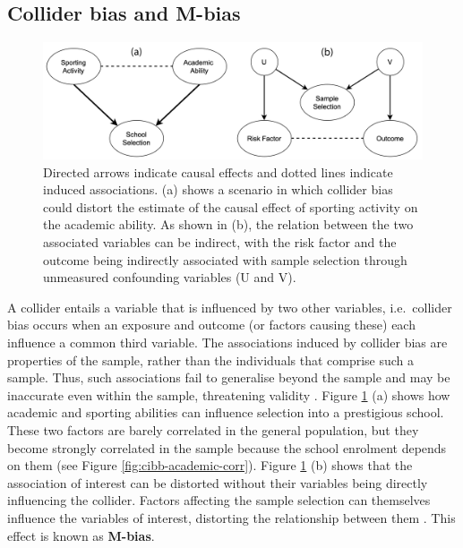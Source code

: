 \documentclass[
]{book}
\begin{document}
\hypertarget{collider-bias-and-m-bias}{%
\subsection{Collider bias and M-bias}\label{collider-bias-and-m-bias}}

\begin{figure}

{\centering \includegraphics[width=0.9\linewidth]{Figures/collider_and_m_bias} 

}

\caption{Directed arrows indicate causal effects and dotted lines indicate induced associations. (a) shows a scenario in which collider bias could distort the estimate of the causal effect of sporting activity on the academic ability. As shown in (b), the relation between the two associated variables can be indirect, with the risk factor and the outcome being indirectly associated with sample selection through unmeasured confounding variables (U and V).}\label{fig:cibb-collider}
\end{figure}

A collider entails a variable that is influenced by two other variables, i.e.~collider bias occurs when an exposure and outcome (or factors causing these) each influence a common third variable. The associations induced by collider bias are properties of the sample, rather than the individuals that comprise such a sample. Thus, such associations fail to generalise beyond the sample and may be inaccurate even within the sample, threatening validity \citep{garcia2021need}. Figure \ref{fig:cibb-collider} (a) shows how academic and sporting abilities can influence selection into a prestigious school. These two factors are barely correlated in the general population, but they become strongly correlated in the sample because the school enrolment depends on them (see Figure \ref{fig:cibb-academic-corr}). Figure \ref{fig:cibb-collider} (b) shows that the association of interest can be distorted without their variables being directly influencing the collider. Factors affecting the sample selection can themselves influence the variables of interest, distorting the relationship between them \citep{griffith2020collider}. This effect is known as \textbf{M-bias}.
\end{document}
